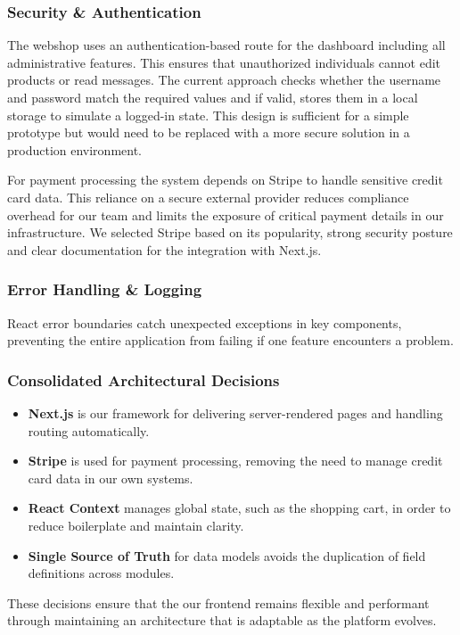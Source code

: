 \subsubsection{Security \& Authentication}
The webshop uses an authentication-based route for the dashboard including all administrative features. This ensures that unauthorized individuals cannot edit products or read messages. The current approach checks whether the username and password match the required values and if valid, stores them in a local storage to simulate a logged-in state. This design is sufficient for a simple prototype but would need to be replaced with a more secure solution in a production environment.

For payment processing the system depends on Stripe to handle sensitive credit card data. This reliance on a secure external provider reduces compliance overhead for our team and limits the exposure of critical payment details in our infrastructure. We selected Stripe based on its popularity, strong security posture and clear documentation for the integration with Next.js. 

\subsubsection{Error Handling \& Logging}
React error boundaries catch unexpected exceptions in key components, preventing the entire application from failing if one feature encounters a problem. 

\subsubsection{Consolidated Architectural Decisions}
\begin{itemize}
  \item \textbf{Next.js} is our framework for delivering server-rendered pages and handling routing automatically.
  \item \textbf{Stripe} is used for payment processing, removing the need to manage credit card data in our own systems.
  \item \textbf{React Context} manages global state, such as the shopping cart, in order to reduce boilerplate and maintain clarity.
  \item \textbf{Single Source of Truth} for data models avoids the duplication of field definitions across modules.
\end{itemize}

These decisions ensure that the our frontend remains flexible and performant through maintaining an architecture that is adaptable as the platform evolves.